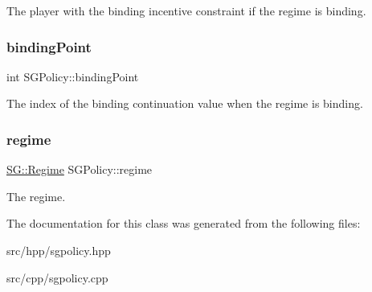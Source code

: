 The player with the binding incentive constraint if the regime is binding. \mbox{\label{classSGPolicy_afcf15ede93b8107513712a58c501bffe}} 
\subsubsection{\texorpdfstring{binding\+Point}{bindingPoint}}
{\footnotesize\ttfamily int S\+G\+Policy\+::binding\+Point\hspace{0.3cm}{\ttfamily [private]}}

The index of the binding continuation value when the regime is binding. \mbox{\label{classSGPolicy_a4e83ce41ec77a683e43f612f3579bd97}} 
\subsubsection{\texorpdfstring{regime}{regime}}
{\footnotesize\ttfamily \hyperlink{namespaceSG_a139e4dec41ea0f38aae1f93f60cfff60}{S\+G\+::\+Regime} S\+G\+Policy\+::regime\hspace{0.3cm}{\ttfamily [private]}}

The regime. 

The documentation for this class was generated from the following files\+:\begin{DoxyCompactItemize}
\item 
src/hpp/sgpolicy.\+hpp\item 
src/cpp/sgpolicy.\+cpp\end{DoxyCompactItemize}
